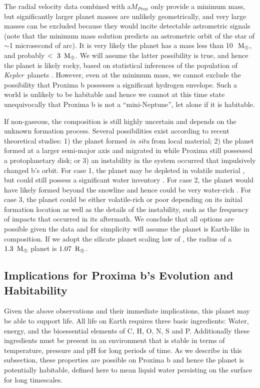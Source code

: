 \documentclass[preprint,12pt]{aastex}
\def\mearth{{\rm\,M_\oplus}}
\def\rearth{{\rm\,R_\oplus}}
\def\kepler{{\it Kepler}}
\begin{document}
The radial velocity data combined with a$M_{Prox}$ only provide a
minimum mass, but significantly larger planet masses are unlikely
geometrically, and very large masses can be excluded because they
would incite detectable astrometric signals (note that the minimum
mass solution predicts an astrometric orbit of the star of $\sim$1
microsecond of arc). It is very likely the planet has a mass less than
10~$\mearth$, and probably $<~3~\mearth$. We will assume the latter
possibility is true, and hence the planet is likely rocky, based on
statistical inferences of the population of \kepler~planets
\cite{WeissMarcy14,Rogers15}. However, even at the minimum mass, we
cannot exclude the possibility that Proxima b possesses a significant
hydrogen envelope. Such a world is unlikely to be habitable \citep[but
  see][]{PierrehumbertGaidos11} and hence we cannot at this time state
unequivocally that Proxima b is not a ``mini-Neptune'', let alone if
it is habitable.

If non-gaseous, the composition is still highly uncertain and depends
on the unknown formation process. Several possibilities exist
according to recent theoretical studies: 1) the planet formed {\it in
  situ} from local material; 2) the planet formed at a larger
semi-major axis and migrated in while Proxima still possessed a
protoplanetary disk; or 3) an instability in the system occurred that
impulsively changed b's orbit. For case 1, the planet may be depleted
in volatile material \citep{Raymond07,Lissauer07}, but could still
possess a significant water inventory \citep{Mulders15}. For case 2,
the planet would have likely formed beyond the snowline and hence
could be very water-rich \citep{CarterBond12}. For case 3, the planet
could be either volatile-rich or poor depending on its initial
formation location as well as the details of the instability, such as
the frequency of impacts that occurred in its aftermath. We conclude
that all options are possible given the data and for simplicity will
assume the planet is Earth-like in composition. If we adopt the
silicate planet scaling law of \cite{Sotin07}, the radius of a
$1.3~\mearth$ planet is $1.07~\rearth$.

\subsection{Implications for Proxima b's Evolution and Habitability}

Given the above observations and their immediate implications, this
planet may be able to support life. All life on Earth requires three
basic ingredients: Water, energy, and the bioessential elements of C,
H, O, N, S and P. Additionally these ingredients must be present in an
environment that is stable in terms of temperature, pressure and pH
for long periods of time. As we describe in this subsection, these
properties are possible on Proxima b and hence the planet is
potentially habitable, defined here to mean liquid water persisting on
the surface for long timescales.
\end{document}
